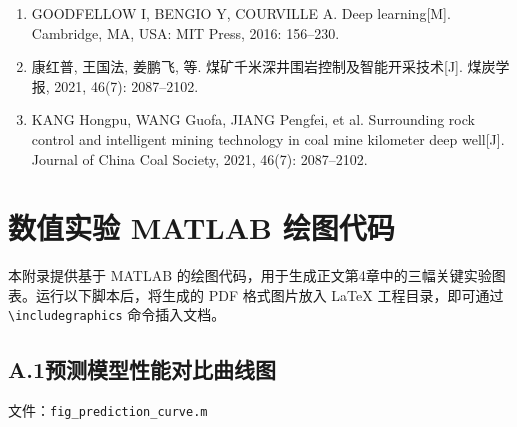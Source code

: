 \documentclass[twocolumn,a4paper]{ctexart}
\numberwithin{equation}{section}
\begin{document}
\begin{flushleft}
\begin{enumerate}
\item[{[23]}] GOODFELLOW I, BENGIO Y, COURVILLE A. Deep learning[M]. Cambridge, MA, USA: MIT Press, 2016: 156--230.

\item[{[24]}] 康红普, 王国法, 姜鹏飞, 等. 煤矿千米深井围岩控制及智能开采技术[J]. 煤炭学报, 2021, 46(7): 2087--2102.

\item[] KANG Hongpu, WANG Guofa, JIANG Pengfei, et al. Surrounding rock control and intelligent mining technology in coal mine kilometer deep well[J]. Journal of China Coal Society, 2021, 46(7): 2087--2102.
\end{enumerate}
\end{flushleft}

\newpage
\onecolumn
\appendix
\section{数值实验 MATLAB 绘图代码}
\label{app:code}

本附录提供基于 MATLAB 的绘图代码，用于生成正文第4章中的三幅关键实验图表。运行以下脚本后，将生成的 PDF 格式图片放入 LaTeX 工程目录，即可通过 \texttt{\textbackslash includegraphics} 命令插入文档。

\subsection*{A.1\quad 预测模型性能对比曲线图}
\label{app:prediction_curve_code}

文件：\texttt{fig\_prediction\_curve.m}
\end{document}
